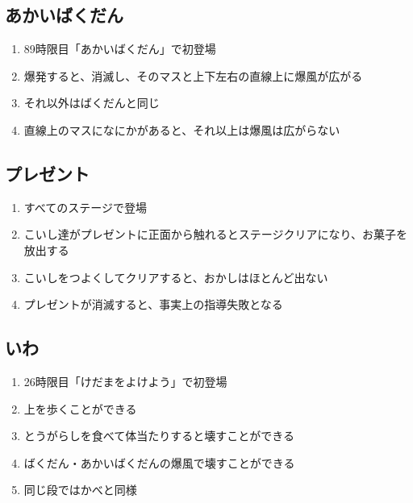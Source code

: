 \subsection{あかいばくだん}
\begin{enumerate}[label={\sarrow}]
\item 89時限目「あかいばくだん」で初登場
\item 爆発すると、消滅し、そのマスと上下左右の直線上に爆風が広がる
\item それ以外はばくだんと同じ
\item 直線上のマスになにかがあると、それ以上は爆風は広がらない
\end{enumerate}


\clearpage



\subsection{プレゼント}
\begin{enumerate}[label={\sarrow}]
\item すべてのステージで登場
\item こいし達がプレゼントに正面から触れるとステージクリアになり、お菓子を放出する
\item こいしをつよくしてクリアすると、おかしはほとんど出ない
\item プレゼントが消滅すると、事実上の指導失敗となる
\end{enumerate}


\subsection{いわ}
\begin{enumerate}[label={\sarrow}]
\item 26時限目「けだまをよけよう」で初登場
\item 上を歩くことができる
\item とうがらしを食べて体当たりすると壊すことができる
\item ばくだん・あかいばくだんの爆風で壊すことができる
\item 同じ段ではかべと同様
\end{enumerate}



